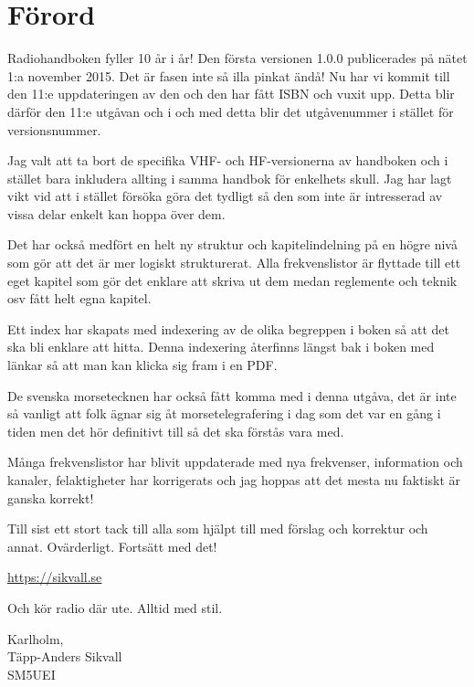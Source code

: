 
\section{Förord}

Radiohandboken fyller 10 år i år! Den första versionen 1.0.0 publicerades på
nätet 1:a november 2015. Det är fasen inte så illa pinkat ändå! Nu har vi
kommit till den 11:e uppdateringen av den och den har fått ISBN och vuxit upp.
Detta blir därför den 11:e utgåvan och i och med detta blir det utgåvenummer i
stället för versionsnummer.

Jag valt att ta bort de specifika VHF- och HF-versionerna av handboken och i
stället bara inkludera allting i samma handbok för enkelhets skull. Jag har
lagt vikt vid att i stället försöka göra det tydligt så den som inte är
intresserad av vissa delar enkelt kan hoppa över dem.

Det har också medfört en helt ny struktur och kapitelindelning på en högre
nivå som gör att det är mer logiskt strukturerat. Alla frekvenslistor är
flyttade till ett eget kapitel som gör det enklare att skriva ut dem medan
reglemente och teknik osv fått helt egna kapitel.

Ett index har skapats med indexering av de olika begreppen i boken så att det
ska bli enklare att hitta. Denna indexering återfinns längst bak i boken med
länkar så att man kan klicka sig fram i en PDF.

De svenska morsetecknen har också fått komma med i denna utgåva, det är inte
så vanligt att folk ägnar sig åt morsetelegrafering i dag som det var en gång
i tiden men det hör definitivt till så det ska förstås vara med.

Många frekvenslistor har blivit uppdaterade med nya frekvenser, information
och kanaler, felaktigheter har korrigerats och jag hoppas att det mesta nu
faktiskt är ganska korrekt!

Till sist ett stort tack till alla som hjälpt till med förslag och korrektur
och annat. Ovärderligt. Fortsätt med det!

\url{https://sikvall.se}

Och kör radio där ute. Alltid med stil.

\vspace{4mm}

\noindent Karlholm, \DokumentDatum\\
Täpp-Anders Sikvall\\
	SM5UEI

